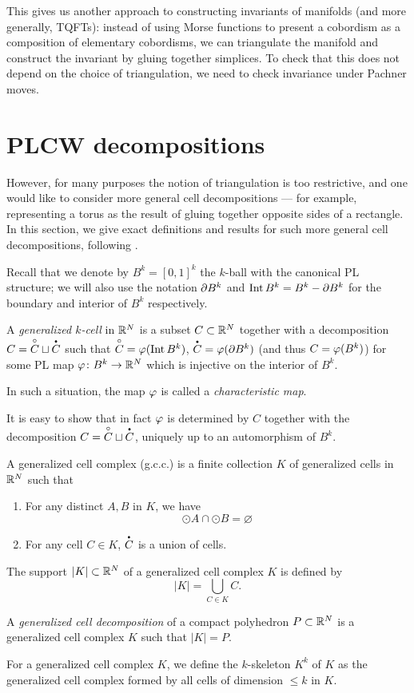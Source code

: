 This gives us another approach to constructing invariants of manifolds (and more
generally, TQFTs): instead of using Morse functions to present a cobordism as a
composition of elementary cobordisms, we can triangulate the manifold and
construct the invariant by gluing together simplices. To check that this does
not depend on the choice of triangulation, we need to check invariance under
Pachner moves.

\section{PLCW decompositions}\label{s:PLCW}
However, for many purposes the notion of triangulation is too restrictive, and
one would like to consider more general cell decompositions --- for example,
representing a torus as the result of gluing together opposite sides of a
rectangle. In this section, we give exact definitions and results for such more
general cell decompositions, following \cite{PLCW}.

Recall that we denote by $B^k=[0,1]^k$ the $k$-ball with the canonical PL
structure; we will also use the notation $\partial B^k$ and $\operatorname{Int} B^k= B^k - \partial
B^k$ for the boundary and interior of $B^k$ respectively.


\begin{definition}\label{d:gen-cell}
A \emph{generalized $k$-cell} in $\mathbb{R}^N$ is a subset $C\subset \mathbb{R}^N$ together
with a decomposition $C=\overset{\circ}{C}\sqcup \overset{\text{\bf\Large .}}{C}$ such that $\overset{\circ}{C}=\varphi(\operatorname{Int}
B^k)$, $\overset{\text{\bf\Large .}}{C}=\varphi(\partial B^k)$ (and thus $C=\varphi(B^k)$) for some PL map
$\varphi\colon B^k\to \mathbb{R}^N$ which is injective on the interior of $B^k$.

In such a situation, the map $\varphi$ is called a \emph{characteristic map}.
\end{definition} It is easy to show that in fact $\varphi$ is determined by $C$
together with the decomposition $C=\overset{\circ}{C}\sqcup \overset{\text{\bf\Large .}}{C}$, uniquely up to an
automorphism of $B^k$.

\begin{definition}\label{d:gen-complex}
  A generalized cell complex (g.c.c.) is a finite collection $K$ of
  generalized cells in $\mathbb{R}^N$ such that
  \begin{enumerate}
    \item For any distinct $A, B$ in $K$, we have
      $$
        \odot{A}\cap \odot{B}=\varnothing
      $$
    \item For any cell $C\in K$, $\overset{\text{\bf\Large .}}{C}$ is a union of cells.
  \end{enumerate}

  The support $|K|\subset \mathbb{R}^N$ of a generalized cell complex $K$ is defined by
  $$
    |K|=\bigcup_{C\in K}C.
  $$

  A \emph{generalized cell decomposition}
  of a compact polyhedron $P\subset \mathbb{R}^N$ is a generalized cell complex $K$ such
  that $|K|=P$.

  For a generalized cell complex $K$, we define the $k$-skeleton $K^k$ of
  $K$ as the generalized cell complex formed by all cells of dimension
  $\le k$ in $K$.
\end{definition}

